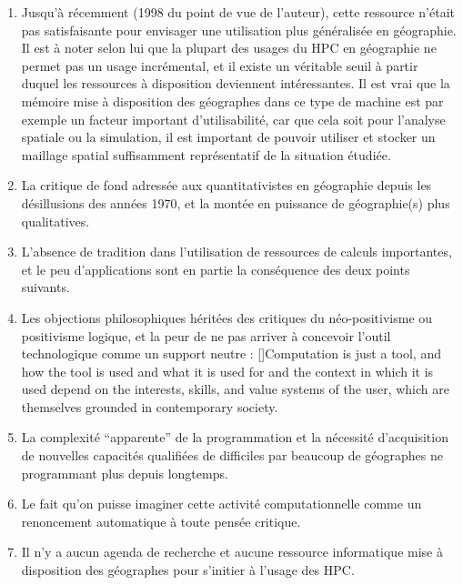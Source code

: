 \begin{enumerate}[label=(\alph*),labelindent=\parindent,leftmargin=*]
\item Jusqu’à récemment (1998 du point de vue de l’auteur), cette ressource n’était pas satisfaisante pour envisager une utilisation plus généralisée en géographie. Il est à noter selon lui que la plupart des usages du HPC en géographie ne permet pas un usage incrémental, et il existe un véritable seuil à partir duquel les ressources à disposition deviennent intéressantes. Il est vrai que la mémoire mise à disposition des géographes dans ce type de machine est par exemple un facteur important d’utilisabilité, car que cela soit pour l’analyse spatiale ou la simulation, il est important de pouvoir utiliser et stocker un maillage spatial suffisamment représentatif de la situation étudiée.
\item  La critique de fond adressée aux quantitativistes en géographie depuis les désillusions des années 1970, et la montée en puissance de géographie(s) plus qualitatives.
\item L’absence de tradition dans l’utilisation de ressources de calculs importantes, et le peu d’applications sont en partie la conséquence des deux points suivants.
\item  Les objections philosophiques héritées des critiques du néo-positivisme ou positivisme logique, et la peur de ne pas arriver à concevoir l’outil technologique comme un support neutre : [{\cite[21]{Openshaw2000}}]{Computation is just a tool, and how the tool is used and what it is used for and the context in which it is used depend on the interests, skills, and value systems of the user, which are themselves grounded in contemporary society.}
\item La complexité \enquote{apparente} de la programmation et la nécessité d'acquisition de nouvelles capacités qualifiées de difficiles par beaucoup de géographes ne programmant plus depuis longtemps.
\item Le fait qu’on puisse imaginer cette activité computationnelle comme un renoncement automatique à toute pensée critique.
\item Il n’y a aucun agenda de recherche et aucune ressource informatique mise à disposition des géographes pour s’initier à l’usage des HPC.

\end{enumerate}

